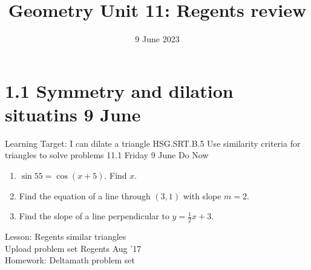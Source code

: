 \documentclass[onlytextwidth, aspectratio=169]{beamer}
\title{Geometry Unit 11: Regents review}
\date{9 June 2023}
\begin{document}
\frame{\titlepage}
\section[Outline]{}
\frame{\tableofcontents}

\section{1.1 Symmetry and dilation situatins \hfill 9 June \,}
\begin{frame}{Learning Target: I can dilate a triangle}
  {HSG.SRT.B.5 Use similarity criteria for triangles to solve problems \hfill \alert{11.1 Friday 9 June}}
    Do Now
    \begin{enumerate}
      \item $\sin 55 = \cos (x+5)$. Find $x$.
      \item Find the equation of a line through $(3,1)$ with slope $m=2$.
      \item Find the slope of a line perpendicular to $y=\frac{1}{2}x+3$.
    \end{enumerate} \vspace{1cm}
    Lesson: Regents similar triangles \\
    Upload problem set Regents Aug '17\\[0.5cm]
    Homework: Deltamath problem set
\end{frame}
\end{document}
